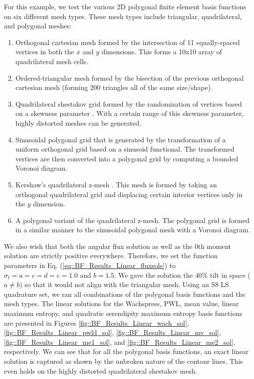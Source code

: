 For this example, we test the various 2D polygonal finite element basis functions on six different mesh types. These mesh types include triangular, quadrilateral, and polygonal meshes:

\begin{enumerate}
	\item Orthogonal cartesian mesh formed by the intersection of 11 equally-spaced vertices in both the $x$ and $y$ dimensions. This forms a 10x10 array of quadrilateral mesh cells.
	\item Ordered-triangular mesh formed by the bisection of the previous orthogonal cartesian mesh (forming 200 triangles all of the same size/shape).
	\item Quadrilateral shestakov grid formed by the randomization of vertices based on a skewness parameter \cite{shestakov1988solution,shestakov1990test}. With a certain range of this skewness parameter, highly distorted meshes can be generated.
	\item Sinusoidal polygonal grid that is generated by the transformation of a uniform orthogonal grid based on a sinusoid functional. The transformed vertices are then converted into a polygonal grid by computing a bounded Voronoi diagram.
	\item Kershaw's quadrilateral z-mesh \cite{kershaw1981differencing}. This mesh is formed by taking an orthogonal quadrilateral grid and displacing certain interior vertices only in the $y$ dimension.
	\item A polygonal variant of the quadrilateral z-mesh. The polygonal grid is formed in a similar manner to the sinusoidal polygonal mesh with a Voronoi diagram.
\end{enumerate}

\noindent We also wish that both the angular flux solution as well as the 0th moment solution are strictly positive everywhere. Therefore, we set the function parameters in Eq. (\ref{eq::BF_Results_Linear_fluxsols}) to $\sigma_t = a = c = d = e = 1.0$ and $b = 1.5$. We gave the solution the $40 \%$ tilt in space ($a \neq b$) so that it would not align with the triangular mesh. Using an S8 LS quadrature set, we ran all combinations of the polygonal basis functions and the mesh types. The linear solutions for the Wachspress, PWL, mean value, linear maximum entropy, and quadratic serendipity maximum entropy basis functions are presented in Figures \ref{fig::BF_Results_Linear_wach_sol}, \ref{fig::BF_Results_Linear_pwld_sol}, \ref{fig::BF_Results_Linear_mv_sol}, \ref{fig::BF_Results_Linear_me1_sol}, and \ref{fig::BF_Results_Linear_me2_sol}, respectively. We can see that for all the polygonal basis functions, an exact linear solution is captured as shown by the unbroken nature of the contour lines. This even holds on the highly distorted quadrilateral shestakov mesh.

